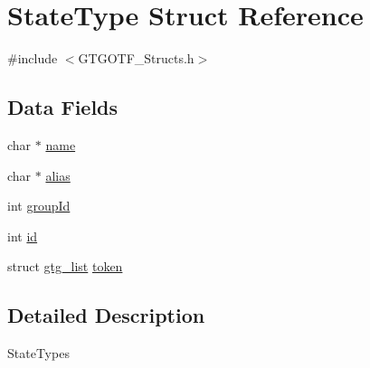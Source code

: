 \hypertarget{structStateType}{\section{State\-Type Struct Reference}
\label{structStateType}
}


{\ttfamily \#include $<$G\-T\-G\-O\-T\-F\-\_\-\-Structs.\-h$>$}

\subsection*{Data Fields}
\begin{DoxyCompactItemize}
\item 
char $\ast$ \hyperlink{structStateType_a032633fe3f7393284c730316651c45a7}{name}
\item 
char $\ast$ \hyperlink{structStateType_a80c2819cc7a07b01c41b7029ff857411}{alias}
\item 
int \hyperlink{structStateType_a66cf0c397f84194ac6a5326f262d200d}{group\-Id}
\item 
int \hyperlink{structStateType_a14249c9d77e0bf8efa00f5ca7f38b001}{id}
\item 
struct \hyperlink{structgtg__list}{gtg\-\_\-list} \hyperlink{structStateType_a39d6516ad97438053c7ffa5cf2cf7d19}{token}
\end{DoxyCompactItemize}


\subsection{Detailed Description}
State\-Types 

